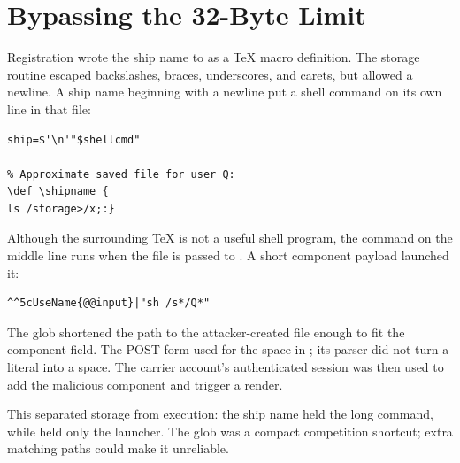 \section{Bypassing the 32-Byte Limit}
\label{sec:carrier-bypass}

Registration wrote the ship name to  as a TeX
macro definition. The storage routine escaped backslashes, braces,
underscores, and carets, but allowed a newline. A ship name beginning
with a newline put a shell command on its own line in that file:

\begin{lstlisting}
ship=$'\n'"$shellcmd"

% Approximate saved file for user Q:
\def \shipname {
ls /storage>/x;:}
\end{lstlisting}

Although the surrounding TeX is not a useful shell program, the command
on the middle line runs when the file is passed to . A short
component payload launched it:

\begin{lstlisting}
^^5cUseName{@@input}|"sh /s*/Q*"
\end{lstlisting}

The glob shortened the path to the attacker-created 
file enough to fit the component field. The POST form used 
for the space in ; its parser did not turn a literal
\code{+} into a space. The carrier account's authenticated session was
then used to add the malicious component and trigger a render.

This separated storage from execution: the ship name held the long
command, while  held only the launcher. The glob was a compact
competition shortcut; extra matching paths could make it unreliable.
